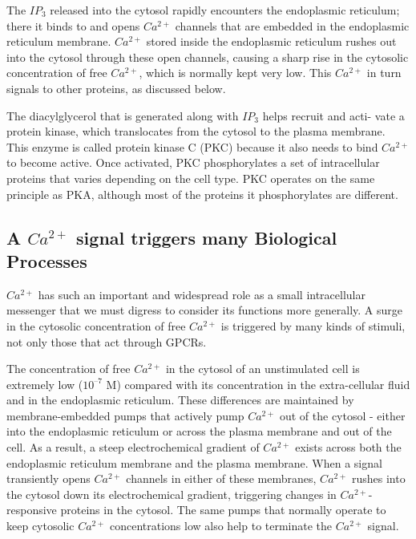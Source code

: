 The $IP_3$ released into the cytosol rapidly encounters the endoplasmic
reticulum; there it binds to and opens $Ca^{2+}$ channels that are embedded in
the endoplasmic reticulum membrane. $Ca^{2+}$ stored inside the endoplasmic
reticulum rushes out into the cytosol through these open channels,
causing a sharp rise in the cytosolic concentration of free
$Ca^{2+}$, which is normally kept very low. This $Ca^{2+}$ in turn signals to other
proteins, as discussed below.

The diacylglycerol that is generated along with $IP_3$ helps recruit and acti-
vate a protein kinase, which translocates from the cytosol to the plasma
membrane. This enzyme is called protein kinase C (PKC) because it also
needs to bind $Ca^{2+}$ to become active. Once activated,
PKC phosphorylates a set of intracellular proteins that varies depending
on the cell type. PKC operates on the same principle as PKA, although
most of the proteins it phosphorylates are different.

\subsection{A $Ca^{2+}$ signal triggers many Biological Processes}

$Ca^{2+}$ has such an important and widespread role as a small intracellular
messenger that we must digress to consider its functions more generally.
A surge in the cytosolic concentration of free $Ca^{2+}$ is triggered by many
kinds of stimuli, not only those that act through GPCRs.

The concentration of free $Ca^{2+}$ in the cytosol of an unstimulated cell is
extremely low ($10^{–7}$ M) compared with its concentration in the extra-cellular
fluid and in the endoplasmic reticulum. These differences are
maintained by membrane-embedded pumps that actively pump $Ca^{2+}$
out of the cytosol - either into the endoplasmic reticulum or across the
plasma membrane and out of the cell. As a result, a steep electrochemical
gradient of $Ca^{2+}$ exists across both the endoplasmic reticulum membrane
and the plasma membrane. When a signal transiently opens $Ca^{2+}$ channels
in either of these membranes, $Ca^{2+}$ rushes
into the cytosol down its electrochemical gradient, triggering changes in
$Ca^{2+}$-responsive proteins in the cytosol. The same pumps that normally
operate to keep cytosolic $Ca^{2+}$ concentrations low also help to terminate
the $Ca^{2+}$ signal.

